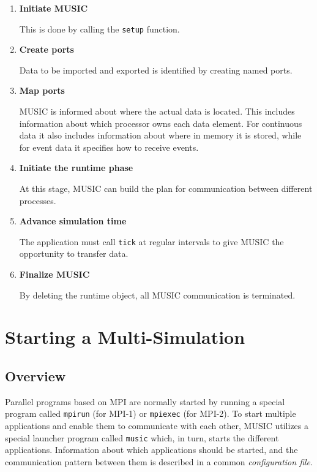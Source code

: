 \documentclass[a4paper,twoside]{report}
\begin{document}
\begin{enumerate}
\item \textbf{Initiate MUSIC}

  This is done by calling the \lstinline!setup! function.
\item \textbf{Create ports}

  Data to be imported and exported is identified by creating named
  ports.
\item \textbf{Map ports}

  MUSIC is informed about where the actual data is located.  This
  includes information about which processor owns each data element.
  For continuous data it also includes information about where in
  memory it is stored, while for event data it specifies how to
  receive events.
\item \textbf{Initiate the runtime phase}

  At this stage, MUSIC can build the plan for communication between
  different processes.
\item \textbf{Advance simulation time}

  The application must call \lstinline!tick! at regular intervals
  to give MUSIC the opportunity to transfer data.
\item \textbf{Finalize MUSIC}

  By deleting the runtime object, all MUSIC communication is terminated.
\end{enumerate}


\chapter{Starting a Multi-Simulation}

\section{Overview}

Parallel programs based on MPI are normally started by running a
special program called \texttt{mpirun} (for MPI-1) or
\texttt{mpiexec} (for MPI-2).  To start multiple
applications and enable them to communicate with each other, MUSIC
utilizes a special launcher program called \texttt{music}
which, in turn, starts the different applications.  Information about
which applications should be started, and the communication pattern
between them is described in a common \emph{configuration
  file}.
\end{document}
